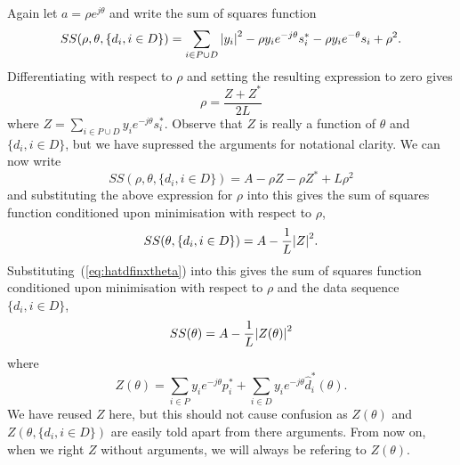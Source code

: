 \documentclass[a4paper,10pt]{article}
\begin{document}
Again let $a = \rho e^{j\theta}$ and write the sum of squares function  
\[
SS(\rho, \theta, \{d_i, i \in D\}) = \sum_{i \in P \cup D} {\left| y_i \right|}^2 - \rho y_i e^{-j\theta} s_i^* - \rho y_i e^{-\theta} s_i + \rho^2.
\]
Differentiating with respect to $\rho$ and setting the resulting expression to zero gives 
\[
\rho = \frac{Z + Z^*}{2L}
\]
where $Z = \sum_{i\in P \cup D}y_i e^{-j\theta} s_i^*$.  Observe that $Z$ is really a function of $\theta$ and $\{d_i, i \in D\}$, but we have supressed the arguments for notational clarity.  We can now write
\[
SS(\rho, \theta, \{d_i, i \in D\}) = A - \rho Z - \rho Z^* + L \rho^2
\]
and substituting the above expression for $\rho$ into this gives the sum of squares function conditioned upon minimisation with respect to $\rho$,
\[
SS(\theta, \{d_i, i \in D\}) = A - \frac{1}{L}{\left| Z \right|}^2.
\]
Substituting~(\ref{eq:hatdfinxtheta}) into this gives the sum of squares function conditioned upon minimisation with respect to $\rho$ and the data sequence $\{d_i, i \in D\}$,
\[
SS(\theta) = A - \frac{1}{L}{\left| Z(\theta) \right|}^2
\]
where
\[
Z(\theta)  = \sum_{i \in P} y_i e^{-j\theta} p_i^* + \sum_{i \in D} y_i e^{-j\theta} \hat{d}_i^*(\theta).
\]
We have reused $Z$ here, but this should not cause confusion as $Z(\theta)$ and $Z(\theta, \{d_i, i \in D\})$ are easily told apart from there arguments.  From now on, when we right $Z$ without arguments, we will always be refering to $Z(\theta)$.
\end{document}
